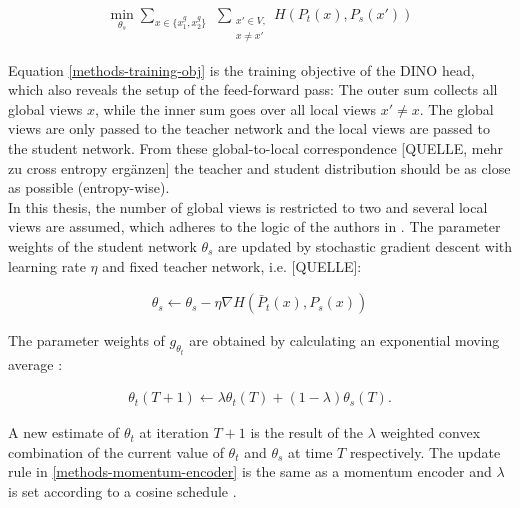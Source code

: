 \begin{align}
	\min_{\theta_s}\sum_{x \in \{x_1^g, x_2^g\}} \hspace{5pt} \sum_{\substack{ x'\in V, \\ x\neq x'}} H(P_t(x),P_s(x'))
	\label{methods-training-obj}
\end{align}

Equation \ref{methods-training-obj} is the training objective of the DINO head, which also reveals the setup of the feed-forward pass:
The outer sum collects all global views $x$, while the inner sum goes over all local views $x'\neq x$.
The global views are only passed to the teacher network and the local views are passed to the student network.
From these global-to-local correspondence [QUELLE, mehr zu cross entropy ergänzen] the teacher and student distribution should be as close as possible (entropy-wise).
\\
In this thesis, the number of global views is restricted to two and several local views are assumed, which adheres to the logic of the authors in \citep{Caron2021}. 
The parameter weights of the student network $\theta_s$ are updated by stochastic gradient descent with learning rate $\eta$ and fixed teacher network, i.e. [QUELLE]:

\begin{align}
	\theta_s \leftarrow \theta_s - \eta \nabla H(\bar{P}_t(x),P_s(x))
\end{align}

The parameter weights of $g_{\theta_t}$ are obtained by calculating an exponential moving average \citep{Grill2020,Caron2021}: 

\begin{align}
	\theta_t(T+1) \leftarrow \lambda \theta_t(T) + (1-\lambda) \theta_s(T).
	\label{methods-momentum-encoder}
\end{align}

A new estimate of $\theta_t$ at iteration $T+1$ is the result of the $\lambda$ weighted convex combination of the current value of $\theta_t$ and $\theta_s$ at time $T$ respectively.
The update rule in \ref{methods-momentum-encoder} is the same as a momentum encoder \citep{He2019} and $\lambda$ is set according to a cosine schedule \citep{Grill2020}.
\newpage
{}

